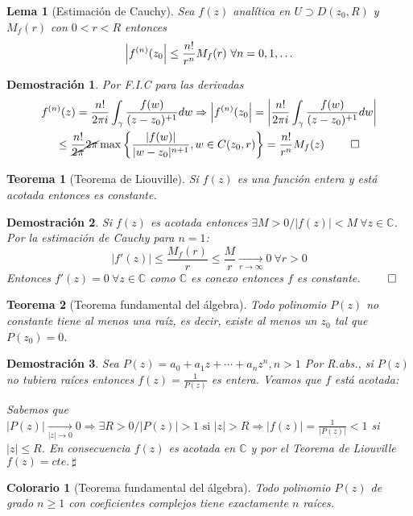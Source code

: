 \documentclass[10pt]{book}
\newtheorem{theorem}{Teorema}[chapter]
\newtheorem*{dem}{Demostración}
\newtheorem{col}{Colorario}[chapter]
\newtheorem{lema}{Lema}[chapter]
\newcommand{\C}{\mathbb{C}}
\begin{document}
\begin{lema}[Estimación de Cauchy]
Sea $f(z)$ analítica en $U \supset D(z_0,R)$ y $M_f(r)$ con $0<r<R$ entonces
$$\left|  f^{(n)}(z_0\right| \leq \frac{n!}{r^n}M_f(r)\ \forall n = 0,1,\ldots$$
\end{lema}

\begin{dem}
Por F.I.C para las derivadas
\begin{multline*}
f^{(n)}(z) = \frac{n!}{2\pi i}\int_\gamma \frac{f(w)}{(z-z_0)^{+1}}dw \Rightarrow \left|  f^{(n)}(z_0\right| = \left|  \frac{n!}{2\pi i}\int_\gamma \frac{f(w)}{(z-z_0)^{+1}}dw \right|\\
 \leq \frac{n!}{\cancel{2\pi}}\cancel{2\pi} \max\left\lbrace\frac{|f(w)|}{|w-z_0|^{n+1}}, w\in C(z_0,r)\right\rbrace = \frac{n!}{r^n}M_f(z) \ \qed
\end{multline*}
\end{dem}


\begin{theorem}[Teorema de Liouville]
Si $f(z)$ es una función entera y está acotada entonces es constante.
\end{theorem}

\begin{dem}
Si $f(z)$ es acotada entonces $\exists M>0 / |f(z)|<M \ \forall z\in \C$. Por la estimación de Cauchy para $n=1$:
$$|f'(z)| \leq \frac{M_f(r)}{r}\leq \frac{M}{r} \xrightarrow[r\to \infty]{} 0 \ \forall r>0$$ Entonces $f'(z)=0 \ \forall z\in\C$ como $\C$ es conexo entonces $f$ es constante. $\qed$
\end{dem}


\begin{theorem}[Teorema fundamental del álgebra]
Todo polinomio $P(z)$ no constante tiene al menos una raíz, es decir, existe al menos un $z_0$ tal que $P(z_0)=0$.
\end{theorem}


\begin{dem}
Sea $P(z) = a_0 + a_1z + \cdots + a_n z^n, n>1$ Por R.abs., si $P(z)$ no tubiera raíces entonces $f(z) = \frac{1}{P(z)}$ es entera. Veamos que $f$ está acotada:

Sabemos que $\displaystyle |P(z)|\xrightarrow[|z|\to 0]{} 0 \Rightarrow \exists R>0 / |P(z)|>1 \text{ si } |z| >R \Rightarrow |f(z)| = \frac{1}{|P(z)|} <1$ si $|z|\leq R$. En consecuencia $f(z)$ es acotada en $\C$ y por el Teorema de Liouville $f(z) = cte.\ \sharp$
\end{dem}

\begin{col}[Teorema fundamental del álgebra]
Todo polinomio $P(z)$ de grado $n\geq 1$ con coeficientes complejos tiene exactamente $n$ raíces.
\end{col}
\end{document}
